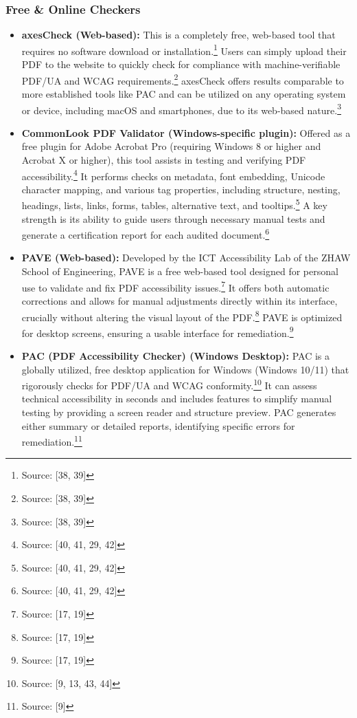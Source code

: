\subsubsection{Free \& Online Checkers}
\begin{itemize}[noitemsep,topsep=0pt]
    \item \textbf{axesCheck (Web-based):} This is a completely free, web-based tool that requires no software download or installation.\footnote{Source: [38, 39]} Users can simply upload their PDF to the website to quickly check for compliance with machine-verifiable PDF/UA and WCAG requirements.\footnote{Source: [38, 39]} axesCheck offers results comparable to more established tools like PAC and can be utilized on any operating system or device, including macOS and smartphones, due to its web-based nature.\footnote{Source: [38, 39]}
    \item \textbf{CommonLook PDF Validator (Windows-specific plugin):} Offered as a free plugin for Adobe Acrobat Pro (requiring Windows 8 or higher and Acrobat X or higher), this tool assists in testing and verifying PDF accessibility.\footnote{Source: [40, 41, 29, 42]} It performs checks on metadata, font embedding, Unicode character mapping, and various tag properties, including structure, nesting, headings, lists, links, forms, tables, alternative text, and tooltips.\footnote{Source: [40, 41, 29, 42]} A key strength is its ability to guide users through necessary manual tests and generate a certification report for each audited document.\footnote{Source: [40, 41, 29, 42]}
    \item \textbf{PAVE (Web-based):} Developed by the ICT Accessibility Lab of the ZHAW School of Engineering, PAVE is a free web-based tool designed for personal use to validate and fix PDF accessibility issues.\footnote{Source: [17, 19]} It offers both automatic corrections and allows for manual adjustments directly within its interface, crucially without altering the visual layout of the PDF.\footnote{Source: [17, 19]} PAVE is optimized for desktop screens, ensuring a usable interface for remediation.\footnote{Source: [17, 19]}
    \item \textbf{PAC (PDF Accessibility Checker) (Windows Desktop):} PAC is a globally utilized, free desktop application for Windows (Windows 10/11) that rigorously checks for PDF/UA and WCAG conformity.\footnote{Source: [9, 13, 43, 44]} It can assess technical accessibility in seconds and includes features to simplify manual testing by providing a screen reader and structure preview. PAC generates either summary or detailed reports, identifying specific errors for remediation.\footnote{Source: [9]}
\end{itemize}

